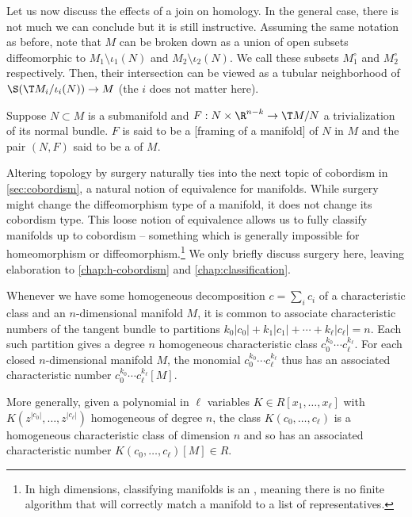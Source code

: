Let us now discuss the effects of a join on homology. In the general case, there is not much we can conclude but it is still instructive. Assuming the same notation as before, note that $M$ can be broken down as a union of open subsets diffeomorphic to $M_1\setminus \iota_1(N)$ and $M_2\setminus \iota_2(N)$. We call these subsets $M_1^\circ$ and $M_2^\circ$ respectively. Then, their intersection can be viewed as a tubular neighborhood of $\S(\T M_i/\iota_i(N)) \to M$ (the $i$ does not matter here). 
\begin{definition}\label{def:framed-submanifold}
	Suppose $N\subset M$ is a submanifold and $F : N\times \R^{n-k} \to \T M /N$ a trivialization of its normal bundle. $F$ is said to be a [framing of a manifold] of $N$ in $M$ and the pair $(N,F)$ said to be a  of $M$.
\end{definition}


Altering topology by surgery naturally ties into the next topic of cobordism in \cref{sec:cobordism}, a natural notion of equivalence for manifolds. While surgery might change the diffeomorphism type of a manifold, it does not change its cobordism type. This loose notion of equivalence allows us to fully classify manifolds up to cobordism -- something which is generally impossible for homeomorphism or diffeomorphism.\footnote{In high dimensions, classifying manifolds is an , meaning there is no finite algorithm that will correctly match a manifold to a list of representatives.} We only briefly discuss surgery here, leaving elaboration to \cref{chap:h-cobordism} and \cref{chap:classification}.

\begin{remark}\label{rmk:characteristic-number-monomial-polynomial}
	Whenever we have some homogeneous decomposition $c=\sum_i c_i$ of a characteristic class and an $n$-dimensional manifold $M$, it is common to associate characteristic numbers of the tangent bundle to partitions $k_0|c_0|+k_1|c_1|+\cdots+k_\ell|c_\ell| = n$. Each such partition gives a degree $n$ homogeneous characteristic class $c_0^{k_0}\cdots c_\ell^{k_\ell}$. For each closed $n$-dimensional manifold $M$, the monomial $c_0^{k_0}\cdots c_\ell^{k_\ell}$ thus has an associated characteristic number $c_0^{k_0}\cdots c_\ell^{k_\ell}[M]$.

	More generally, given a polynomial in $\ell$ variables $K\in R[x_1,\ldots, x_\ell]$ with $K(z^{|c_0|}, \ldots, z^{|c_\ell|})$ homogeneous of degree $n$, the class $K(c_0,\ldots, c_\ell)$ is a homogeneous characteristic class of dimension $n$ and so has an associated characteristic number $K(c_0, \ldots, c_\ell)[M] \in R$.
\end{remark}

